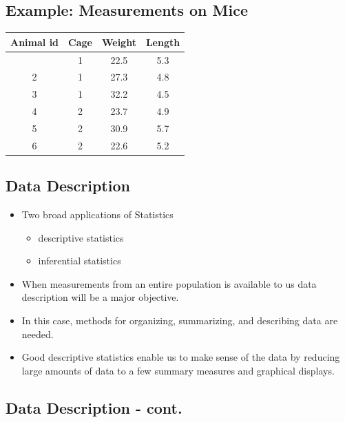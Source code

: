 \documentclass[
  letterpaper,
  DIV=11,
  numbers=noendperiod]{scrartcl}
\newcounter{none} %
\begin{document}
\subsection{Example: Measurements on
Mice}\label{example-measurements-on-mice}

{\def\LTcaptype{none} %
\begin{longtable}[]{@{}cccc@{}}
\toprule\noalign{}
Animal id & Cage & Weight & Length \\
\midrule\noalign{}
\endhead
\bottomrule\noalign{}
\endlastfoot
1 & 1 & 22.5 & 5.3 \\
2 & 1 & 27.3 & 4.8 \\
3 & 1 & 32.2 & 4.5 \\
4 & 2 & 23.7 & 4.9 \\
5 & 2 & 30.9 & 5.7 \\
6 & 2 & 22.6 & 5.2 \\
\end{longtable}
}

\subsection{Data Description}\label{data-description}

\begin{itemize}
\item
  {Two broad applications of Statistics}\\

  \begin{itemize}
  \item
    descriptive statistics
  \item
    inferential statistics
  \end{itemize}
\item
  When measurements from an entire population is available to us data
  description will be a major objective.
\item
  In this case, methods for organizing, summarizing, and describing data
  are needed.
\item
  Good descriptive statistics enable us to make sense of the data by
  reducing large amounts of data to a few summary measures and graphical
  displays.
\end{itemize}

\subsection{Data Description - cont.}\label{data-description---cont.}
\end{document}
